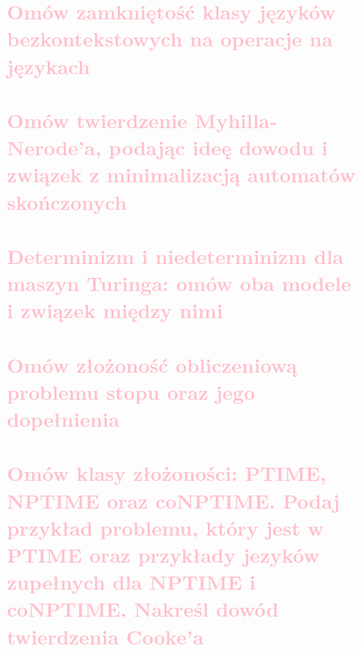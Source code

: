 \section{\textcolor{pink}{Omów zamkniętość klasy języków bezkontekstowych na operacje na językach}}


\section{\textcolor{pink}{Omów twierdzenie Myhilla-Nerode'a, podając ideę dowodu i związek z minimalizacją automatów skończonych}}


\section{\textcolor{pink}{Determinizm i niedeterminizm dla maszyn Turinga: omów oba modele i związek
między nimi}}



\section{\textcolor{pink}{Omów złożoność obliczeniową problemu stopu oraz jego dopełnienia}}


\section{\textcolor{pink}{Omów klasy złożoności: PTIME, NPTIME oraz coNPTIME. Podaj przykład
problemu, który jest w PTIME oraz przykłady jezyków zupełnych dla NPTIME i coNPTIME.
Nakreśl dowód twierdzenia Cooke'a}}
